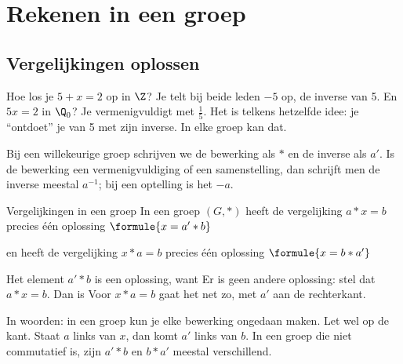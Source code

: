 
\begin{oefeningen}
\end{oefeningen}

\section{Rekenen in een groep}

\subsection{Vergelijkingen oplossen}

Hoe los je $5 + x = 2$ op in $\Z$? Je telt bij beide leden $-5$ op, de inverse van 5. En $5x = 2$ in $\Q_0$? Je vermenigvuldigt met $\frac15$. Het is telkens hetzelfde idee: je ``ontdoet'' je van 5 met zijn inverse. In elke groep kan dat.

Bij een willekeurige groep schrijven we de bewerking als $\ast$ en de inverse als $a'$. Is de bewerking een vermenigvuldiging of een samenstelling, dan schrijft men de inverse meestal $a^{-1}$; bij een optelling is het $-a$.

\begin{theorie}
\begin{stelling}{Vergelijkingen in een groep}
In een groep $(G, \ast)$ heeft de vergelijking $a \ast x = b$ precies één oplossing \quad $\formule{x = a' \ast b}$

\vspace{1mm}
en heeft de vergelijking $x \ast a = b$ precies één oplossing \quad $\formule{x = b \ast a'}$
\end{stelling}

\begin{bewijs}
Het element $a' \ast b$ is een oplossing, want
Er is geen andere oplossing: stel dat $a \ast x = b$. Dan is
Voor $x \ast a = b$ gaat het net zo, met $a'$ aan de rechterkant.
\end{bewijs}
\end{theorie}

In woorden: in een groep kun je elke bewerking ongedaan maken. Let wel op de kant. Staat $a$ links van $x$, dan komt $a'$ links van $b$. In een groep die niet commutatief is, zijn $a' \ast b$ en $b \ast a'$ meestal verschillend.

